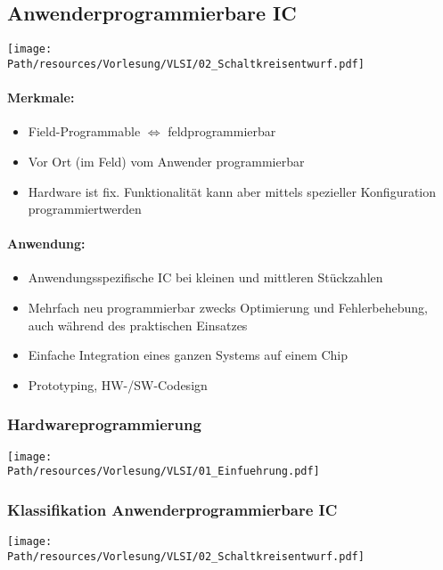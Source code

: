 	
\newpage
\subsection{Anwenderprogrammierbare IC}
	\begin{center}
		\texttt{[image: \\Path/resources/Vorlesung/VLSI/02\_Schaltkreisentwurf.pdf]}
	\end{center}
	\paragraph{Merkmale:}
	\begin{itemize}		
		\item Field-Programmable $\Leftrightarrow$ feldprogrammierbar
		\item Vor Ort (im Feld) vom Anwender programmierbar
		\item Hardware ist fix. Funktionalität kann aber mittels spezieller Konfiguration \grqq programmiert\grqq werden
	\end{itemize}
	\paragraph{Anwendung:}
	\begin{itemize}
		\item Anwendungsspezifische IC bei kleinen und mittleren Stückzahlen
		\item Mehrfach neu programmierbar zwecks Optimierung und Fehlerbehebung, auch während des praktischen Einsatzes
		\item Einfache Integration eines ganzen Systems auf einem Chip
		\item Prototyping, HW-/SW-Codesign
	\end{itemize}
	\subsubsection{Hardwareprogrammierung}
		\begin{center}
		\texttt{[image: \\Path/resources/Vorlesung/VLSI/01\_Einfuehrung.pdf]}
		\end{center}
	\subsubsection{Klassifikation Anwenderprogrammierbare IC}
		\begin{center}
			\texttt{[image: \\Path/resources/Vorlesung/VLSI/02\_Schaltkreisentwurf.pdf]}
		\end{center}

